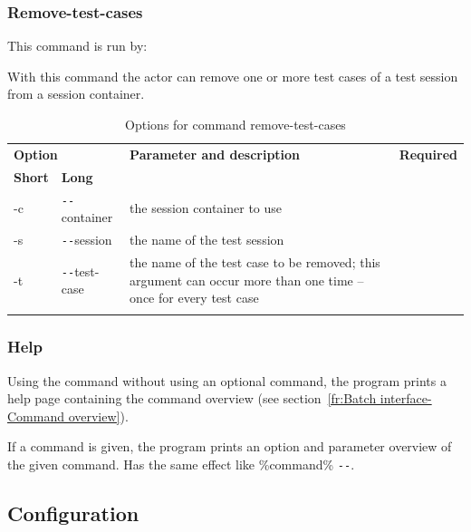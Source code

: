 \subsubsection{Remove-test-cases}
This command is run by:
\begin{quote}
\end{quote}
\par
With this command the actor can remove one or more test cases of a test session from a session container.

\begin{longtable}{|l|l|p{73mm}|c|}\hline
   \multicolumn{2}{|l|}{\textbf{Option}} & 
   {\textbf{Parameter and description}} & 
   {\textbf{Required}} \\
   {\textbf{Short}} &
   {\textbf{Long}} &
    & 
   \\\hline \hline \endhead
   -c & \verb$--$container & the session container to use & \x \\\hline
   -s & \verb$--$session & the name of the test session & \x \\\hline
   -t & \verb$--$test-case & the name of the test case to be removed; this argument can occur more than one time -- once for every test case & \x \\\hline
  \caption{Options for command remove-test-cases}
  \label{fr_tb:Options for command remove-test-cases}
\end{longtable}

\subsubsection{Help}
\begin{quote}
\end{quote}
\par
Using the command  without using an optional command, the program prints a help page containing the command overview (see section~\ref{fr:Batch interface-Command overview}).
\par
If a command is given, the program prints an option and parameter overview of the given command. Has the same effect like  \%command\% \verb$--$.

\subsection{Configuration} \label{fr:Configuration}
